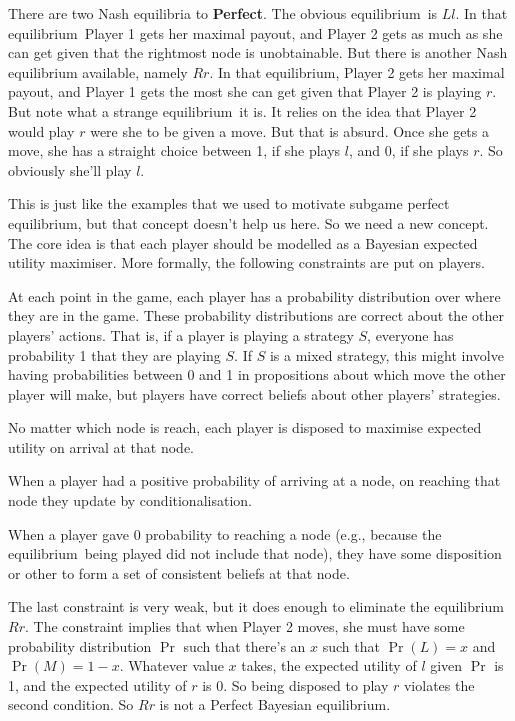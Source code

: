 \documentclass[openany]{book}
\newcommand{\eqm}{equilibrium}
\begin{document}
There are two Nash equilibria to \textbf{Perfect}. The obvious \eqm\ is $Ll$. In that \eqm\, Player 1 gets her maximal payout, and Player 2 gets as much as she can get given that the rightmost node is unobtainable. But there is another Nash equilibrium available, namely $Rr$. In that \eqm, Player 2 gets her maximal payout, and Player 1 gets the most she can get given that Player 2 is playing $r$. But note what a strange \eqm\ it is. It relies on the idea that Player 2 would play $r$ were she to be given a move. But that is absurd. Once she gets a move, she has a straight choice between 1, if she plays $l$, and 0, if she plays $r$. So obviously she'll play $l$. 

This is just like the examples that we used to motivate subgame perfect \eqm, but that concept doesn't help us here. So we need a new concept. The core idea is that each player should be modelled as a Bayesian expected utility maximiser. More formally, the following constraints are put on players.

\begin{enumerate*}
\item At each point in the game, each player has a probability distribution over where they are in the game. These probability distributions are correct about the other players' actions. That is, if a player is playing a strategy $S$, everyone has probability 1 that they are playing $S$. If $S$ is a mixed strategy, this might involve having probabilities between 0 and 1 in propositions about which move the other player will make, but players have correct beliefs about other players' strategies.
\item No matter which node is reach, each player is disposed to maximise expected utility on arrival at that node.
\item When a player had a positive probability of arriving at a node, on reaching that node they update by conditionalisation.
\item When a player gave 0 probability to reaching a node (e.g., because the \eqm\ being played did not include that node), they have some disposition or other to form a set of consistent beliefs at that node.
\end{enumerate*}
The last constraint is very weak, but it does enough to eliminate the \eqm\ $Rr$. The constraint implies that when Player 2 moves, she must have some probability distribution $\Pr$ such that there's an $x$ such that $\Pr(L) = x$ and $\Pr(M) = 1-x$. Whatever value $x$ takes, the expected utility of $l$ given $\Pr$ is 1, and the expected utility of $r$ is 0. So being disposed to play $r$ violates the second condition. So $Rr$ is not a Perfect Bayesian \eqm.
\end{document}
